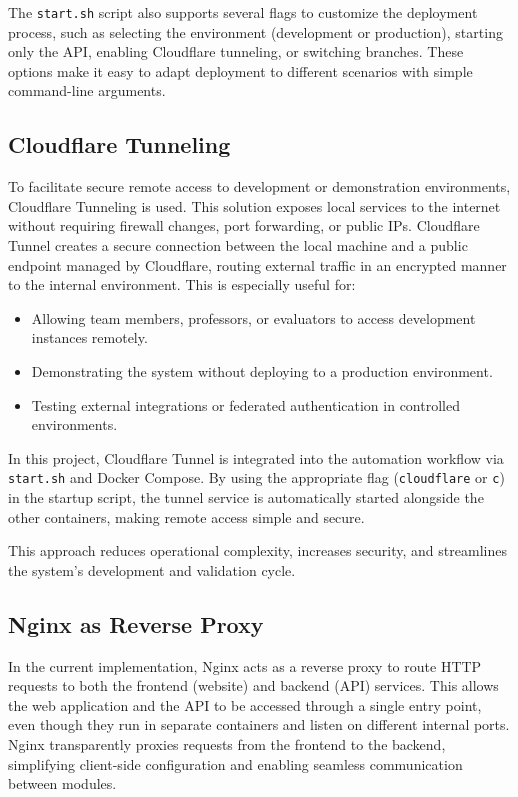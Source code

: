 The \texttt{start.sh} script also supports several flags to customize the deployment process, such as selecting the environment (development or production), starting only the API, enabling Cloudflare tunneling, or switching branches. These options make it easy to adapt deployment to different scenarios with simple command-line arguments.

\subsection{Cloudflare Tunneling} \label{subsec:cloudflare_tunneling}

To facilitate secure remote access to development or demonstration environments, Cloudflare Tunneling is used. This solution exposes local services to the internet without requiring firewall changes, port forwarding, or public IPs. Cloudflare Tunnel creates a secure connection between the local machine and a public endpoint managed by Cloudflare, routing external traffic in an encrypted manner to the internal environment. This is especially useful for:

\begin{itemize}
    \item Allowing team members, professors, or evaluators to access development instances remotely.
    \item Demonstrating the system without deploying to a production environment.
    \item Testing external integrations or federated authentication in controlled environments.
\end{itemize}

In this project, Cloudflare Tunnel is integrated into the automation workflow via \texttt{start.sh} and Docker Compose. By using the appropriate flag (\texttt{cloudflare} or \texttt{c}) in the startup script, the tunnel service is automatically started alongside the other containers, making remote access simple and secure.

This approach reduces operational complexity, increases security, and streamlines the system's development and validation cycle.

\subsection{Nginx as Reverse Proxy} \label{subsec:nginx_reverse_proxy}

In the current implementation, Nginx acts as a reverse proxy to route HTTP requests to both the frontend (website) and backend (API) services. This allows the web application and the API to be accessed through a single entry point, even though they run in separate containers and listen on different internal ports. Nginx transparently proxies requests from the frontend to the backend, simplifying client-side configuration and enabling seamless communication between modules.

